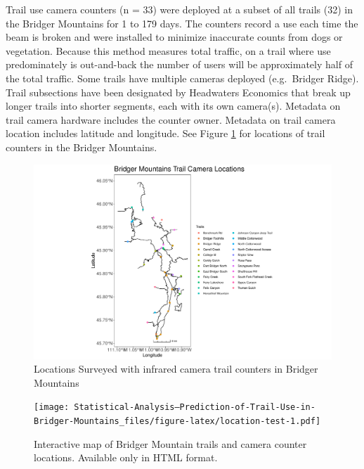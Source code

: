 \documentclass[
]{book}
\begin{document}
Trail use camera counters (n =
33) were deployed at a subset of
all trails
(32)
in the Bridger Mountains for 1
to 179 days. The counters
record a use each time the beam is broken and were installed to minimize
inaccurate counts from dogs or vegetation. Because this method measures
total traffic, on a trail where use predominately is out-and-back the
number of users will be approximately half of the total traffic. Some
trails have multiple cameras deployed (e.g.~Bridger Ridge). Trail
subsections have been designated by Headwaters Economics that break up
longer trails into shorter segments, each with its own camera(s).
Metadata on trail camera hardware includes the counter owner. Metadata
on trail camera location includes latitude and longitude. See Figure
\ref{fig:counter-locations} for locations of trail counters in the
Bridger Mountains.

\begin{figure}

{\centering \includegraphics[width=1\linewidth]{../figures/camera_locations} 

}

\caption{Locations Surveyed with infrared camera trail counters in Bridger Mountains}\label{fig:counter-locations}
\end{figure}

\begin{figure}
\centering
\texttt{[image: Statistical-Analysis--Prediction-of-Trail-Use-in-Bridger-Mountains\_files/figure-latex/location-test-1.pdf]}
\caption{\label{fig:location-test}Interactive map of Bridger Mountain trails and camera counter locations. Available only in HTML format.}
\end{figure}
\end{document}
